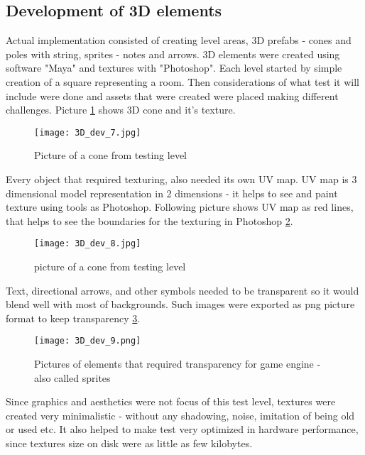 \subsection{Development of 3D elements}
Actual implementation consisted of creating level areas, 3D prefabs - cones and poles with string, sprites - notes and arrows. 3D elements were created using software "Maya" and textures with "Photoshop". Each level started by simple creation of a square representing a room. Then considerations of what test it will include were done and assets that were created were placed making different challenges. Picture \ref{3dDevelopment1} shows 3D cone and it's texture.
\begin{figure}[H]
\centering
\texttt{[image: 3D\_dev\_7.jpg]}
\caption{Picture of a cone from testing level}
\label {3dDevelopment1}
\end{figure}
Every object that required texturing, also needed its own UV map. UV map is 3 dimensional model representation in 2 dimensions - it helps to see and paint texture using tools as Photoshop. Following picture shows UV map as red lines, that helps to see the boundaries for the texturing in Photoshop \ref{3dDevelopment2}.
\begin{figure}[H]
\centering
\texttt{[image: 3D\_dev\_8.jpg]}
\caption{picture of a cone from testing level}
\label {3dDevelopment2}
\end{figure}
Text, directional arrows, and other symbols needed to be transparent so it would blend well with most of backgrounds. Such images were exported as png picture format to keep transparency \ref {3dDevelopment3}. 
\begin{figure}[H]
\centering
\texttt{[image: 3D\_dev\_9.png]}
\caption{Pictures of elements that required transparency for game engine - also called sprites}
\label {3dDevelopment3}
\end{figure}
Since graphics and aesthetics were not focus of this test level, textures were created very minimalistic - without any shadowing, noise, imitation of being old or used etc. It also helped to make test very optimized in hardware performance, since textures size on disk were as little as few kilobytes.
